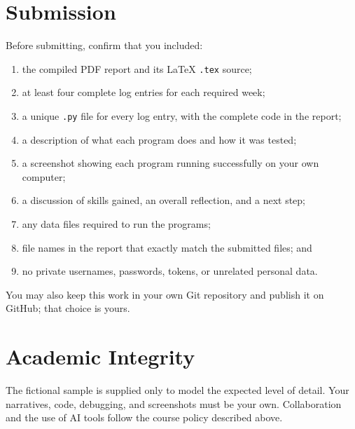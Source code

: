 \documentclass[11pt]{article}
\begin{document}
\section{Submission}
Before submitting, confirm that you included:
\begin{enumerate}[label=$\square$]
  \item the compiled PDF report and its \LaTeX{} \texttt{.tex} source;
  \item at least four complete log entries for each required week;
  \item a unique \texttt{.py} file for every log entry, with the complete code in the report;
  \item a description of what each program does and how it was tested;
  \item a screenshot showing each program running successfully on your own computer;
  \item a discussion of skills gained, an overall reflection, and a next step;
  \item any data files required to run the programs;
  \item file names in the report that exactly match the submitted files; and
  \item no private usernames, passwords, tokens, or unrelated personal data.
\end{enumerate}

You may also keep this work in your own Git repository and publish it on GitHub; that choice is yours.

\section{Academic Integrity}
The fictional sample is supplied only to model the expected level of detail. Your narratives, code, debugging, and screenshots must be your own. Collaboration and the use of AI tools follow the course policy described above.
\end{document}
